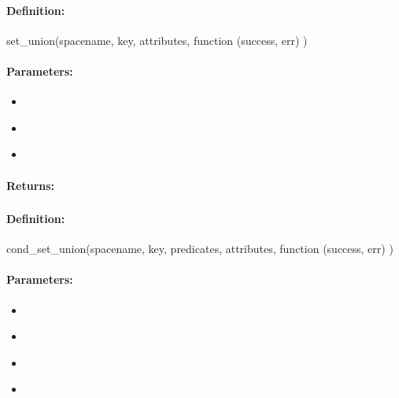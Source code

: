 \paragraph{Definition:}
\begin{javascriptcode}
set_union(spacename, key, attributes, function (success, err) {})
\end{javascriptcode}
\paragraph{Parameters:}
\begin{itemize}[noitemsep]
\item {}\\

\item {}\\

\item {}\\

\end{itemize}

\paragraph{Returns:}


\pagebreak
\subsubsection{}
\label{api:nodejs:cond_set_union}


\paragraph{Definition:}
\begin{javascriptcode}
cond_set_union(spacename, key, predicates, attributes, function (success, err) {})
\end{javascriptcode}
\paragraph{Parameters:}
\begin{itemize}[noitemsep]
\item {}\\

\item {}\\

\item {}\\

\item {}\\

\end{itemize}

